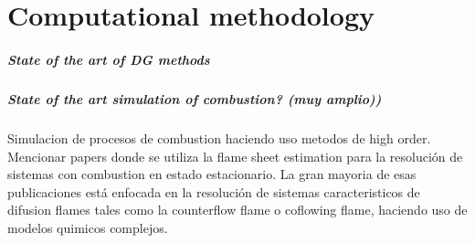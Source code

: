 \chapter{Computational methodology} \label{ch:CompMethodology}
%
\paragraph{State of the art of DG methods}

\paragraph{State of the art simulation of combustion? (muy amplio))}
Simulacion de procesos de combustion haciendo uso metodos de high order. Mencionar papers donde se utiliza la flame sheet estimation para la resolución de sistemas con combustion en estado estacionario. La gran mayoria de esas publicaciones está enfocada en la resolución de sistemas caracteristicos de difusion flames tales como la counterflow flame o coflowing flame, haciendo uso de modelos quimicos complejos. 



